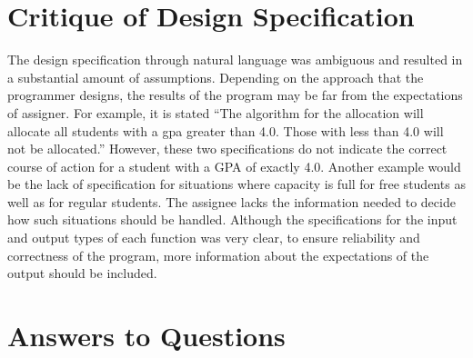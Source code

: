 \documentclass[12pt]{article}
\begin{document}
\section{Critique of Design Specification}
The design specification through natural language was ambiguous and resulted in a substantial amount of assumptions. Depending on the approach that the programmer designs, the results of the program may be far from the expectations of assigner. For example, it is stated ``The algorithm for the allocation will allocate all students with a gpa greater than 4.0. Those with less than 4.0 will not be allocated.'' However, these two specifications do not indicate the correct course of action for a student with a GPA of exactly 4.0. Another example would be the lack of specification for situations where capacity is full for free students as well as for regular students. The assignee lacks the information needed to decide how such situations should be handled. Although the specifications for the input and output types of each function was very clear, to ensure reliability and correctness of the program, more information about the expectations of the output should be included.

\section{Answers to Questions}
\end{document}
